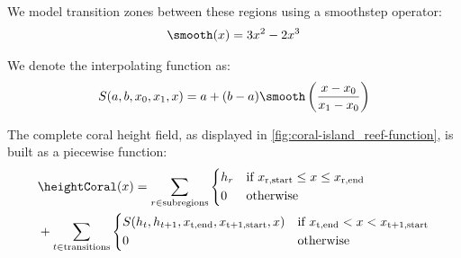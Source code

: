 \documentclass{egpubl}
\begin{document}
We model transition zones between these regions using a smoothstep operator:
\begin{align}
    \smooth(x) = 3x^2 - 2x^3
\end{align}

We denote the interpolating function as:
\begin{align}
    S(a, b, x_0, x_1, x) = a + (b-a) \smooth\left(\frac{x - x_0}{x_1 - x_0}\right)
\end{align}

The complete coral height field, as displayed in \cref{fig:coral-island_reef-function}, is built as a piecewise function:
\begin{align}
    \label{eq:coral-island_full-reef-function}
    &\heightCoral(x) = \sum_{r \in \text{subregions}}{
    \begin{dcases}
        h_r & \text{if } x_{\text{r,start}} \leq x \leq x_{\text{r,end}} \\
        0 & \text{otherwise}
    \end{dcases}
    } \nonumber \\ 
    &+
    \sum_{t \in \text{transitions}} {
        \begin{dcases}
            S(h_{t}, h_{t+1}, x_{\text{t,end}}, x_{\text{t+1,start}}, x) & \text{if } x_{\text{t,end}} < x < x_{\text{t+1,start}} \\
            0 & \text{otherwise}
        \end{dcases}
    }
\end{align}



\end{document}
